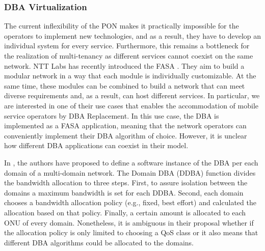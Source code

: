 \subsubsection{\ac{DBA} Virtualization}
The current inflexibility of the \ac{PON} makes it practically impossible for the operators to implement new technologies, and as a result, they have to develop an individual system for every service. Furthermore, this remains a bottleneck for the realization of multi-tenancy as different services cannot coexist on the same network. \ac{NTT} Labs has recently introduced the \ac{FASA} \cite{8242359}. They aim to build a modular network in a way that each module is individually customizable. At the same time, these modules can be combined to build a network that can meet diverse requirements and, as a result, can host different services. In particular, we are interested in one of their use cases that enables the accommodation of mobile service operators by \ac{DBA} Replacement. In this use case, the \ac{DBA} is implemented as a \ac{FASA} application, meaning that the network operators can conveniently implement their \ac{DBA} algorithm of choice. However, it is unclear how different \ac{DBA} applications can coexist in their model.

In \cite{kashima__virt}, the authors have proposed to define a software instance of the \ac{DBA} per each domain of a multi-domain network. The Domain DBA (DDBA) function divides the bandwidth allocation to three steps. First, to assure isolation between the domains a maximum bandwidth is set for each DDBA. Second, each domain chooses a bandwidth allocation policy (e.g., fixed, best effort) and calculated the allocation based on that policy. Finally, a certain amount is allocated to each \ac{ONU} of every domain. Nonetheless, it is ambiguous in their proposal whether if the allocation policy is only limited to choosing a \ac{QoS} class or it also means that different \ac{DBA} algorithms could be allocated to the domains.
















